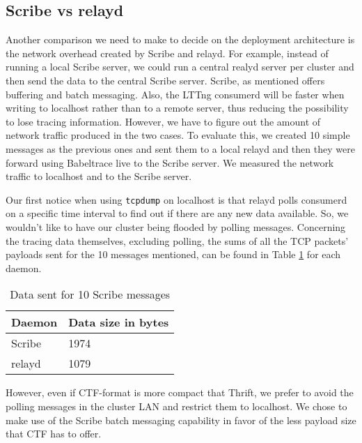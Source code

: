 \subsection{Scribe vs relayd}
Another comparison we need to make to decide on the deployment architecture is
the network overhead created by Scribe and relayd. For example, instead of
running a local Scribe server, we could run a central realyd server per cluster
and then send the data to the central Scribe server.  Scribe, as mentioned
offers buffering and batch messaging. Also, the LTTng consumerd will be faster
when writing to localhost rather than to a remote server, thus reducing the
possibility to lose tracing information. However, we have to figure out the
amount of network traffic produced in the two cases. To evaluate this, we
created 10 simple messages as the previous ones and sent them to a local relayd
and then they were forward using Babeltrace live to the Scribe server. We
measured the network traffic to localhost and to the Scribe server.

Our first notice when using \texttt{tcpdump} on localhost is that relayd polls
consumerd on a specific time interval to find out if there are any new data
available. So, we wouldn't like to have our cluster being flooded by polling
messages. Concerning the tracing data themselves, excluding polling, the sums of
all the TCP packets' payloads sent for the 10 messages mentioned, can be found
in Table \ref{tab:relayd-scribe} for each daemon.

\begin{table}[H]
    \centering
    \begin{tabular}{ | l | l | }
        \hline
        Daemon & Data size in bytes \\ \hline \hline
        Scribe & 1974 \\ \hline
        relayd  & 1079 \\ \hline
    \end{tabular}
    \caption{Data sent for 10 Scribe messages}
    \label{tab:relayd-scribe}
\end{table}

However, even if CTF-format is more compact that Thrift, we prefer to avoid the
polling messages in the cluster LAN and restrict them to localhost. We chose to
make use of the Scribe batch messaging capability in favor of the less payload
size that CTF has to offer.

